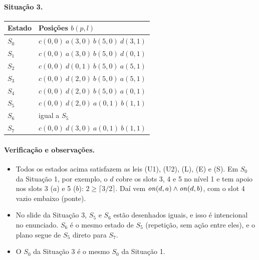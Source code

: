 \paragraph{Situação 3.}
\begin{center}
\begin{tabular}{l l}
\toprule
Estado & Posições $b(p,l)$ \\
\midrule
$S_0$ & $c(0,0)\ a(3,0)\ b(5,0)\ d(3,1)$ \\
$S_1$ & $c(0,0)\ a(3,0)\ b(5,0)\ d(0,1)$ \\
$S_2$ & $c(0,0)\ d(0,1)\ b(5,0)\ a(5,1)$ \\
$S_3$ & $c(0,0)\ d(2,0)\ b(5,0)\ a(5,1)$ \\
$S_4$ & $c(0,0)\ d(2,0)\ b(5,0)\ a(0,1)$ \\
$S_5$ & $c(0,0)\ d(2,0)\ a(0,1)\ b(1,1)$ \\
$S_6$ & igual a $S_5$ \\
$S_7$ & $c(0,0)\ d(3,0)\ a(0,1)\ b(1,1)$ \\
\bottomrule
\end{tabular}
\end{center}

\paragraph{Verificação e observações.}
\begin{itemize}
\item Todos os estados acima satisfazem as leis (U1), (U2), (L), (E) e (S). Em $S_0$ da Situação 1, por exemplo, o $d$ cobre os slots 3, 4 e 5 no nível 1 e tem apoio nos slots 3 ($a$) e 5 ($b$): $2\ge\lceil 3/2\rceil$. Daí vem $\mathit{on}(d,a)\land\mathit{on}(d,b)$, com o slot 4 vazio embaixo (ponte).
\item No slide da Situação 3, $S_5$ e $S_6$ estão desenhados iguais, e isso é intencional no enunciado. $S_6$ é o mesmo estado de $S_5$ (repetição, sem ação entre eles), e o plano segue de $S_5$ direto para $S_7$.
\item O $S_0$ da Situação 3 é o mesmo $S_0$ da Situação 1.
\end{itemize}
